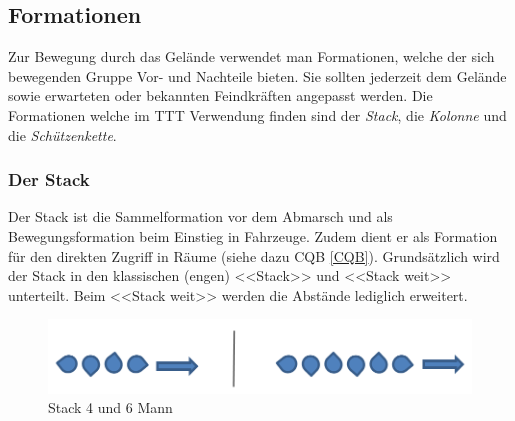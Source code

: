 \subsection{Formationen}
Zur Bewegung durch das Gelände verwendet man Formationen, welche der sich bewegenden Gruppe Vor- und Nachteile bieten. Sie sollten jederzeit dem Gelände sowie erwarteten oder bekannten Feindkräften angepasst werden. Die Formationen welche im TTT Verwendung finden sind der \textit{Stack}, die \textit{Kolonne} und die \textit{Schützenkette}. 

\subsubsection{Der Stack}
Der Stack ist die Sammelformation vor dem Abmarsch und als Bewegungsformation beim Einstieg in Fahrzeuge. Zudem dient er als Formation für den direkten Zugriff in Räume (siehe dazu CQB \autoref{CQB}). Grundsätzlich wird der Stack in den klassischen (engen) <<Stack>> und <<Stack weit>> unterteilt. Beim <<Stack weit>> werden die Abstände lediglich erweitert.\\
\begin{figure}[!htb]
	\centering
	\includegraphics[width=15cm]{./Grafiken/Abschnitt/Stack.png}
	\caption{Stack 4 und 6 Mann}
\end{figure}

